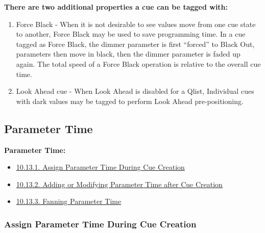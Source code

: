 \documentclass[
]{article}
\begin{document}
\textbf{There are two additional properties a cue can be tagged with:}

\begin{enumerate}
\def\labelenumi{\arabic{enumi}.}
\item
  Force Black - When it is not desirable to see values move from one cue state to another, Force Black may be used to save programming time. In a cue tagged as Force Black, the dimmer parameter is first ``forced'' to Black Out, parameters then move in black, then the dimmer parameter is faded up again. The total speed of a Force Black operation is relative to the overall cue time.
\item
  {Look Ahead cue - When Look Ahead is disabled for a Qlist, Individual cues with dark values may be tagged to perform Look Ahead pre-positioning.}
\end{enumerate}

\hypertarget{parameter-time}{%
\subsection{Parameter Time}\label{parameter-time}}

\textbf{Parameter Time:}

\begin{itemize}
\item
  \href{https://vibemanual.compulite.com/programming-cues-and-scenes.html\#assign-parameter-time-during-cue-creation}{10.13.1. Assign Parameter Time During Cue Creation}
\item
  \href{https://vibemanual.compulite.com/programming-cues-and-scenes.html\#adding-or-modifying-parameter-time-after-cue-creation}{10.13.2. Adding or Modifying Parameter Time after Cue Creation}
\item
  \href{https://vibemanual.compulite.com/programming-cues-and-scenes.html\#fanning-parameter-time}{10.13.3. Fanning Parameter Time}
\end{itemize}

\hypertarget{assign-parameter-time-during-cue-creation}{%
\subsubsection{Assign Parameter Time During Cue Creation}\label{assign-parameter-time-during-cue-creation}}
\end{document}
